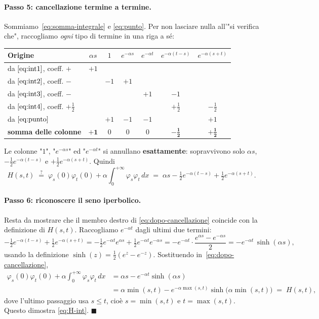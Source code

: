 \documentclass[11pt,a4paper]{article}
\theoremstyle{plain}
\theoremstyle{definition}
\theoremstyle{remark}
\begin{document}
\paragraph{Passo 5: cancellazione termine a termine.} Sommiamo~\eqref{eq:somma-integrale} e
\eqref{eq:punto}. Per non lasciare nulla all'"si verifica che", raccogliamo \emph{ogni} tipo
di termine in una riga a sé:

\begin{center}
\renewcommand{\arraystretch}{1.3}
\begin{tabular}{lcccccc}
\toprule
\textbf{Origine} & $\alpha s$ & $1$ & $e^{-\alpha s}$ & $e^{-\alpha t}$
  & $e^{-\alpha(t-s)}$ & $e^{-\alpha(s+t)}$ \\
\midrule
da $\eqref{eq:int1}$, coeff. $+$ & $+1$ & & & & & \\
da $\eqref{eq:int2}$, coeff. $-$ & & $-1$ & $+1$ & & & \\
da $\eqref{eq:int3}$, coeff. $-$ & & & & $+1$ & $-1$ & \\
da $\eqref{eq:int4}$, coeff. $+\tfrac12$ & & & & & $+\tfrac12$ & $-\tfrac12$ \\
da $\eqref{eq:punto}$ & & $+1$ & $-1$ & $-1$ & & $+1$ \\
\midrule
\textbf{somma delle colonne} & $\mathbf{+1}$ & $0$ & $0$ & $0$
  & $\mathbf{-\tfrac12}$ & $\mathbf{+\tfrac12}$ \\
\bottomrule
\end{tabular}
\end{center}

Le colonne "$1$", "$e^{-\alpha s}$" ed "$e^{-\alpha t}$" si annullano \textbf{esattamente}:
sopravvivono solo $\alpha s$, $-\tfrac12 e^{-\alpha(t-s)}$ e $+\tfrac12 e^{-\alpha(s+t)}$. Quindi
\begin{equation}
  H(s,t) \;\overset{?}{=}\; \varphi_s(0)\varphi_t(0)+\alpha\!\int_0^{+\infty}\!\varphi_s\varphi_t\,dx
  \;=\; \alpha s - \tfrac12 e^{-\alpha(t-s)} + \tfrac12 e^{-\alpha(s+t)} .
  \label{eq:dopo-cancellazione}
\end{equation}

\paragraph{Passo 6: riconoscere il seno iperbolico.} Resta da mostrare che il membro destro di
\eqref{eq:dopo-cancellazione} coincide con la definizione di $H(s,t)$. Raccogliamo
$e^{-\alpha t}$ dagli ultimi due termini:
\[
  -\tfrac12 e^{-\alpha(t-s)} + \tfrac12 e^{-\alpha(s+t)}
  = -\tfrac12 e^{-\alpha t}e^{\alpha s} + \tfrac12 e^{-\alpha t}e^{-\alpha s}
  = -e^{-\alpha t}\cdot\frac{e^{\alpha s}-e^{-\alpha s}}{2}
  = -e^{-\alpha t}\,\sinh(\alpha s),
\]
usando la definizione $\sinh(z)=\tfrac12(e^{z}-e^{-z})$. Sostituendo in~\eqref{eq:dopo-cancellazione},
\begin{align*}
  \varphi_s(0)\varphi_t(0)+\alpha\!\int_0^{+\infty}\!\varphi_s\varphi_t\,dx
  &= \alpha s - e^{-\alpha t}\sinh(\alpha s)\\
  &= \alpha\min(s,t) - e^{-\alpha\max(s,t)}\sinh\!\bigl(\alpha\min(s,t)\bigr) \;=\; H(s,t),
\end{align*}
dove l'ultimo passaggio usa $s\le t$, cioè $s=\min(s,t)$ e $t=\max(s,t)$. Questo dimostra
\eqref{eq:H-int}. $\blacksquare$
\end{document}
